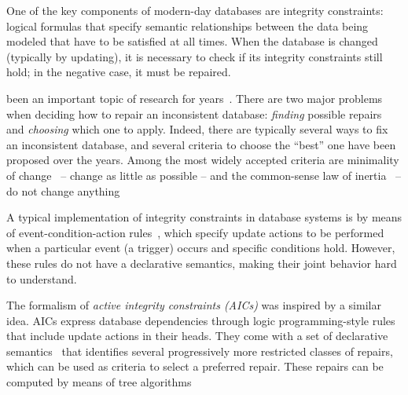 One of the key components of modern-day databases are integrity constraints: logical formulas that specify semantic relationships between the data being modeled that have to be satisfied at all times.
When the database is changed (typically by updating), it is necessary to check if its integrity constraints still hold; in the negative case, it must be repaired.

 been an important topic of research for  years~\cite{icdt/Abiteboul88}.
There are two major problems when deciding how to repair an inconsistent database: \emph{finding} possible repairs and \emph{choosing} which one to apply.
Indeed, there are typically several ways to fix an inconsistent database, and several criteria to choose the ``best'' one have been proposed over the years.
Among the most widely accepted criteria are minimality of change~\cite{Winslett90,ai/EiterG92} -- change as little as possible -- and the common-sense law of inertia~\cite{PrzymusinskiT97} -- do not change anything 

A typical implementation of integrity constraints in database systems is by means of event-condition-action rules~\cite{TenienteO95,WidomC96}, which specify update actions to be performed when a particular event (a trigger) occurs and specific conditions hold.
However, these rules do not have a declarative semantics, making their joint behavior hard to understand.

The formalism of \emph{active integrity constraints (AICs)} \cite{ppdp/FlescaGZ04} was inspired by a similar idea.
AICs express database dependencies through logic programming-style rules that include update actions in their heads.
They come with a set of declarative semantics~\cite{tplp/CaropreseT11} that identifies several progressively more restricted classes of repairs, which can be used as criteria to select a preferred repair.
These repairs can be computed by means of tree algorithms

